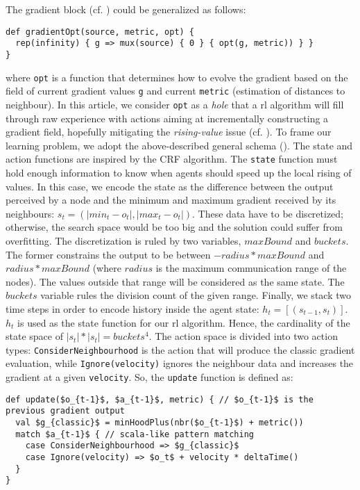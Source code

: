 The gradient block (cf. ) could be generalized as follows:
\begin{lstlisting}
def gradientOpt(source, metric, opt) {
  rep(infinity) { g => mux(source) { 0 } { opt(g, metric)) } }
}
\end{lstlisting}
where \lstinline|opt| is a function that determines how to evolve the gradient based on the field of current gradient values \lstinline|g| and current \lstinline|metric| (estimation of distances to neighbour). 
In this article, we consider \lstinline|opt| as a \emph{hole} that a \ac{rl} algorithm will fill through raw experience
 with actions aiming at incrementally constructing a gradient field, hopefully mitigating the \emph{rising-value} issue (cf. ).
%
To frame our learning problem, we adopt the above-described general schema (). The state and action functions are inspired by the CRF algorithm.
%
The \lstinline|state| function must hold enough information to know when agents should speed up the local rising of values.
%
In this case, we encode the state as the difference between the output perceived by a node and the minimum and maximum gradient received by its neighbours: $s_t = (|min_t - o_t|, |max_t - o_t|)$. 
%
These data have to be discretized; otherwise, the search space would be too big and the solution could suffer from overfitting. 
%
The discretization is ruled by two variables, $maxBound$ and $buckets$. 
%
The former constrains the output to be between $ - radius * maxBound$ and $ radius * maxBound $ (where $radius$ is the maximum communication range of the nodes). 
%
The values outside that range will be considered as the same state.
%
The $buckets$ variable rules the division count of the given range. 
Finally, we stack two time steps in order to encode history inside the agent state:
$h_t = [(s_{t - 1}, s_t)]$. $h_t$ is used as the state function for our \ac{rl} algorithm.
Hence, the cardinality of the state space of $|s_t| * |s_t| = buckets^4$. 
%
The action space is divided into two action types: \texttt{ConsiderNeighbourhood} is the action that will produce the classic gradient evaluation, while 
 \texttt{Ignore(velocity)} ignores the neighbour data and increases the gradient at a given \texttt{velocity}. So, the \texttt{update} function is defined as:
\begin{lstlisting}[mathescape]
def update($o_{t-1}$, $a_{t-1}$, metric) { // $o_{t-1}$ is the previous gradient output
  val $g_{classic}$ = minHoodPlus(nbr($o_{t-1}$) + metric())
  match $a_{t-1}$ { // scala-like pattern matching
    case ConsiderNeighbourhood => $g_{classic}$
    case Ignore(velocity) => $o_t$ + velocity * deltaTime() 
  }
}
\end{lstlisting}
